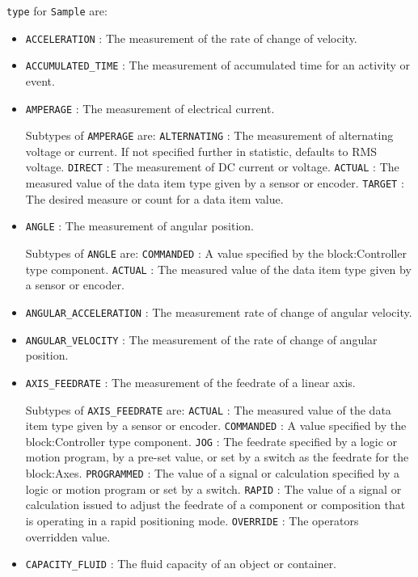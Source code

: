  \texttt{type} for \texttt{Sample} are:
\begin{itemize}

\item \texttt{ACCELERATION} : The measurement of the rate of change of velocity. 

\item \texttt{ACCUMULATED_TIME} : The measurement of accumulated time for an activity or event. 

\item \texttt{AMPERAGE} : The measurement of electrical current. 

Subtypes of \texttt{AMPERAGE} are: 
\newline\tab \texttt{ALTERNATING} : The measurement of alternating voltage or current.   If not specified further in statistic, defaults to RMS voltage.  
\newline\tab \texttt{DIRECT} : The measurement of DC current or voltage. 
\newline\tab \texttt{ACTUAL} : The measured value of the data item type given by a sensor or encoder. 
\newline\tab \texttt{TARGET} : The desired measure or count for a data item value. 
\item \texttt{ANGLE} : The measurement of angular position. 

Subtypes of \texttt{ANGLE} are: 
\newline\tab \texttt{COMMANDED} : A value specified by the {block:Controller} type component. 
\newline\tab \texttt{ACTUAL} : The measured value of the data item type given by a sensor or encoder. 
\item \texttt{ANGULAR_ACCELERATION} : The measurement rate of change of angular velocity. 

\item \texttt{ANGULAR_VELOCITY} : The measurement of the rate of change of angular position. 

\item \texttt{AXIS_FEEDRATE} : The measurement of the feedrate of a linear axis. 

Subtypes of \texttt{AXIS_FEEDRATE} are: 
\newline\tab \texttt{ACTUAL} : The measured value of the data item type given by a sensor or encoder. 
\newline\tab \texttt{COMMANDED} : A value specified by the {block:Controller} type component. 
\newline\tab \texttt{JOG} : The feedrate specified by a logic or motion program, by a pre-set value, or set by a switch as the feedrate for the {block:Axes}.  
\newline\tab \texttt{PROGRAMMED} : The value of a signal or calculation specified by a logic or motion program or set by a switch. 
\newline\tab \texttt{RAPID} : The value of a signal or calculation issued to adjust the feedrate of a component or composition that is operating in a rapid positioning mode. 
\newline\tab \texttt{OVERRIDE} : The operators overridden value. 
\item \texttt{CAPACITY_FLUID} : The fluid capacity of an object or container. 


\end{itemize}
